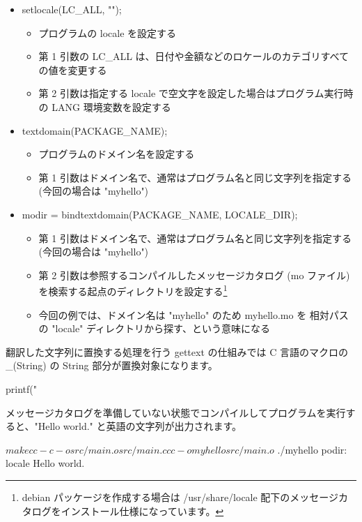 \documentclass[mingoth,a4paper]{jsarticle}
\begin{document}
\begin{itemize}
\item setlocale(LC\_ALL, "");
  \begin{itemize}
  \item プログラムの locale を設定する
  \item 第 1 引数の LC\_ALL は、日付や金額などのロケールのカテゴリすべての値を変更する
  \item 第 2 引数は指定する locale で空文字を設定した場合はプログラム実行時の LANG 環境変数を設定する
  \end{itemize}
\item textdomain(PACKAGE\_NAME);
  \begin{itemize}
  \item プログラムのドメイン名を設定する
  \item 第 1 引数はドメイン名で、通常はプログラム名と同じ文字列を指定する (今回の場合は "myhello")
  \end{itemize}
\item modir = bindtextdomain(PACKAGE\_NAME, LOCALE\_DIR);
  \begin{itemize}
  \item 第 1 引数はドメイン名で、通常はプログラム名と同じ文字列を指定する (今回の場合は "myhello")
  \item 第 2 引数は参照するコンパイルしたメッセージカタログ (mo ファイル) を検索する起点のディレクトリを設定する\footnote{debian パッケージを作成する場合は /usr/share/locale 配下のメッセージカタログをインストール仕様になっています。}
  \item 今回の例では、ドメイン名は "myhello" のため myhello.mo を 相対パスの "locale" ディレクトリから探す、という意味になる
  \end{itemize}
\end{itemize}

翻訳した文字列に置換する処理を行う gettext の仕組みでは C 言語のマクロの \_(String) の String 部分が置換対象になります。

\begin{commandline}
    printf("%
\end{commandline}

メッセージカタログを準備していない状態でコンパイルしてプログラムを実行すると、"Hello world." と英語の文字列が出力されます。

\begin{commandline}
$ make
cc -c -o src/main.o src/main.c
cc -o myhello  src/main.o

$ ./myhello
podir: locale
Hello world.
\end{commandline}
\end{document}
